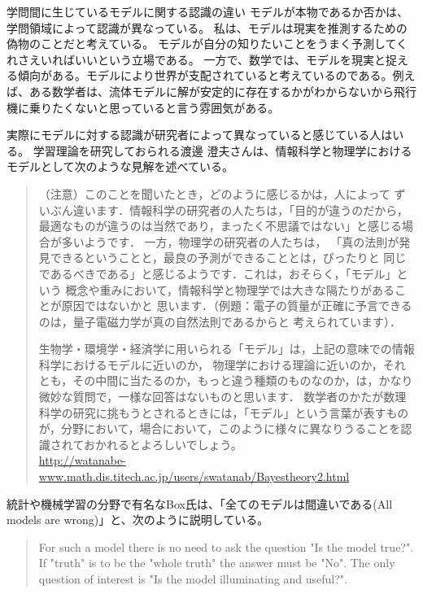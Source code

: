 \begin{SMbox}{学問間に生じているモデルに関する認識の違い}
モデルが本物であるか否かは、学問領域によって認識が異なっている。
私は、モデルは現実を推測するための偽物のことだと考えている。
モデルが自分の知りたいことをうまく予測してくれさえいればいいという立場である。
一方で、数学では、モデルを現実と捉える傾向がある。モデルにより世界が支配されていると考えているのである。例えば、ある数学者は、流体モデルに解が安定的に存在するかがわからないから飛行機に乗りたくないと思っていると言う雰囲気がある。

実際にモデルに対する認識が研究者によって異なっていると感じている人はいる。
学習理論を研究しておられる渡邊 澄夫さんは、情報科学と物理学におけるモデルとして次のような見解を述べている。
\begin{quote}
    （注意）このことを聞いたとき，どのように感じるかは，人によって ずいぶん違います．情報科学の研究者の人たちは，「目的が違うのだから， 最適なものが違うのは当然であり，まったく不思議ではない」と感じる場合が多いようです． 一方，物理学の研究者の人たちは， 「真の法則が発見できるということと，最良の予測ができることとは，ぴったりと 同じであるべきである」と感じるようです．これは，おそらく，「モデル」という 概念や重みにおいて，情報科学と物理学では大きな隔たりがあることが原因ではないかと 思います．（例題：電子の質量が正確に予言できるのは，量子電磁力学が真の自然法則であるからと 考えられています）．

    生物学・環境学・経済学に用いられる「モデル」は，上記の意味での情報科学におけるモデルに近いのか， 物理学における理論に近いのか，それとも，その中間に当たるのか，もっと違う種類のものなのか，は，かなり微妙な質問で，一様な回答はないものと思います． 数学者のかたが数理科学の研究に挑もうとされるときには，「モデル」という言葉が表すものが，分野において，場合において，このように様々に異なりうることを認識されておかれるとよろしいでしょう。
    \\ \url{http://watanabe-www.math.dis.titech.ac.jp/users/swatanab/Bayestheory2.html}
\end{quote}

統計や機械学習の分野で有名なBox氏は、「全てのモデルは間違いである(All models are wrong)」と、次のように説明している。

\begin{quote}
    For such a model there is no need to ask the question "Is the model true?". If "truth" is to be the "whole truth" the answer must be "No". The only question of interest is "Is the model illuminating and useful?".
\end{quote}


\end{SMbox}


